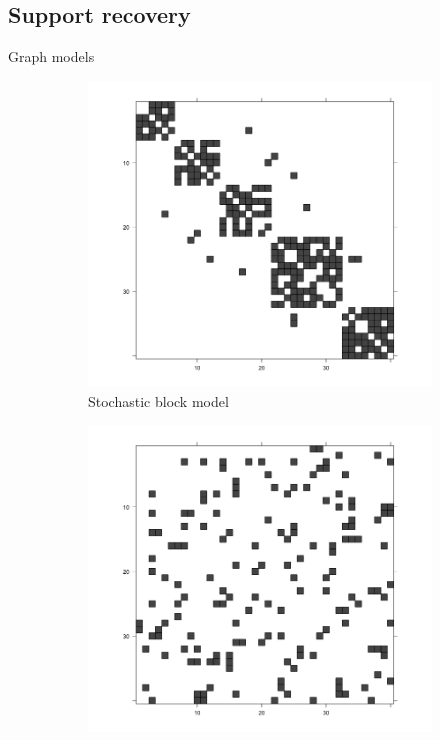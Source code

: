 \documentclass[11pt]{beamer}
\begin{document}
										\subsection{Support recovery}
										\begin{frame}{Graph models}
											\begin{figure}
												\centering
												\begin{subfigure}[b]{0.30\textwidth}
													\includegraphics[width=\textwidth]{images/graph_stochastic_block.png}
													\caption{Stochastic block model}
												\end{subfigure}
												\begin{subfigure}[b]{0.30\textwidth}
													\includegraphics[width=\textwidth]{images/graph_erdos.png}

\end{subfigure}
\end{figure}
\end{frame}
\end{document}
